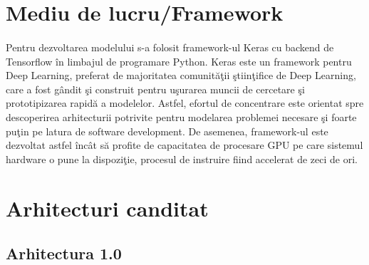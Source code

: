 \section{Mediu de lucru/Framework}

\paragraph{}
Pentru dezvoltarea modelului s-a folosit framework-ul Keras cu backend de Tensorflow \^ in limbajul de programare Python. Keras este un framework pentru Deep Learning, preferat de majoritatea comunit\u a\c tii \c stiin\c tifice de Deep Learning, care a fost g\^ andit \c si construit pentru u\c surarea muncii de cercetare \c si prototipizarea rapid\u a a modelelor. Astfel, efortul de concentrare este orientat spre descoperirea arhitecturii potrivite pentru modelarea problemei necesare \c si foarte pu\c tin pe latura de software development. De asemenea, framework-ul este dezvoltat astfel \^ inc\^ at s\u a profite de capacitatea de procesare GPU pe care sistemul hardware o pune la dispozi\c tie, procesul de instruire fiind accelerat de zeci de ori.

\section{Arhitecturi canditat}

\subsection{Arhitectura 1.0}

